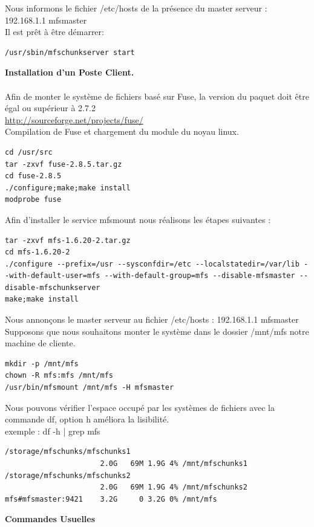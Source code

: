 \documentclass[12pt]{report}
\begin{document}
Nous informons le fichier /etc/hosts de la présence du master serveur : 192.168.1.1 mfsmaster\\
Il est prêt à être démarrer:
  \begin{lstlisting}
/usr/sbin/mfschunkserver start
	  \end{lstlisting}
\textbf{Installation d'un Poste Client.}\\\\
Afin de monter le système de fichiers basé sur Fuse, la version du paquet doit être égal ou supérieur à 2.7.2\\
\href{http://sourceforge.net/projects/fuse/}{http://sourceforge.net/projects/fuse/} \\
Compilation de Fuse et chargement du module du noyau linux.\\
  \begin{lstlisting}
cd /usr/src
tar -zxvf fuse-2.8.5.tar.gz
cd fuse-2.8.5
./configure;make;make install
modprobe fuse
	  \end{lstlisting}
\newpage
Afin d'installer le service mfsmount nous réalisons les étapes suivantes :
  \begin{lstlisting}
tar -zxvf mfs-1.6.20-2.tar.gz
cd mfs-1.6.20-2
./configure --prefix=/usr --sysconfdir=/etc --localstatedir=/var/lib --with-default-user=mfs --with-default-group=mfs --disable-mfsmaster --disable-mfschunkserver
make;make install
	  \end{lstlisting}
Nous annonçons le master serveur au fichier /etc/hosts : 192.168.1.1   mfsmaster\\
Supposons que nous souhaitons monter le système dans le dossier /mnt/mfs notre machine de cliente.\\
  \begin{lstlisting}
mkdir -p /mnt/mfs
chown -R mfs:mfs /mnt/mfs
/usr/bin/mfsmount /mnt/mfs -H mfsmaster
	  \end{lstlisting}
Nous pouvons vérifier l'espace occupé par les systèmes de fichiers avec la commande df, option h améliora la lisibilité.\\
exemple : df -h | grep mfs\\
  \begin{lstlisting}
/storage/mfschunks/mfschunks1
                      2.0G   69M 1.9G 4% /mnt/mfschunks1
/storage/mfschunks/mfschunks2
                      2.0G   69M 1.9G 4% /mnt/mfschunks2
mfs#mfsmaster:9421    3.2G     0 3.2G 0% /mnt/mfs
	  \end{lstlisting}
\textbf{Commandes Usuelles}\\\\
\end{document}
